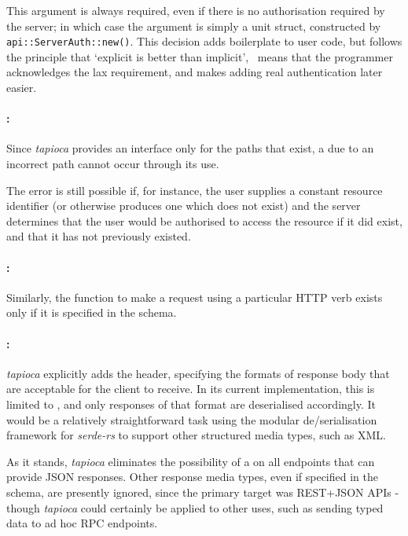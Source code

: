 This argument is always required, even if there is no authorisation required by the server; in which case the argument is simply a unit struct, constructed by \texttt{api::ServerAuth::new()}. This decision adds boilerplate to user code, but follows the principle that `explicit is better than implicit',~\cite{zen_python} means that the programmer acknowledges the lax requirement, and makes adding real authentication later easier.

\paragraph{:} Since \emph{tapioca} provides an interface only for the paths that exist, a  due to an incorrect path cannot occur through its use.

The error is still possible if, for instance, the user supplies a constant resource identifier (or otherwise produces one which does not exist) and the server determines that the user would be authorised to access the resource if it did exist, and that it has not previously existed.

\paragraph{:} Similarly, the function to make a request using a particular HTTP verb exists only if it is specified in the schema.

\paragraph{:} \emph{tapioca} explicitly adds the  header, specifying the formats of response body that are acceptable for the client to receive. In its current implementation, this is limited to , and only responses of that format are deserialised accordingly. It would be a relatively straightforward task using the modular de/serialisation framework for \emph{serde-rs} to support other structured media types, such as XML.

As it stands, \emph{tapioca} eliminates the possibility of a  on all endpoints that can provide JSON responses. Other response media types, even if specified in the schema, are presently ignored, since the primary target was REST+JSON APIs - though \emph{tapioca} could certainly be applied to other uses, such as sending typed data to ad hoc RPC endpoints.

